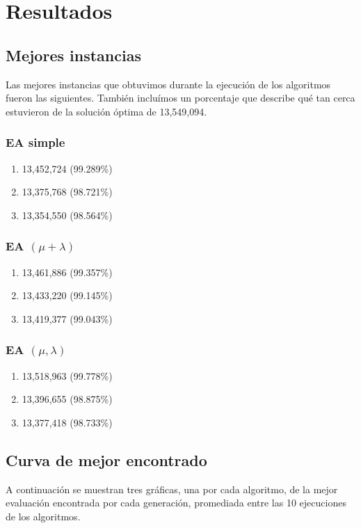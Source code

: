 \documentclass[sigconf,authorversion,nonacm]{acmart}
\begin{document}
\section{Resultados}
\subsection{Mejores instancias}
Las mejores instancias que obtuvimos durante la ejecución de los algoritmos fueron las siguientes. También incluímos un porcentaje que describe qué tan cerca estuvieron de la solución óptima de 13,549,094.

\subsubsection{EA simple}
\begin{enumerate}
  \item 13,452,724 (99.289\%)
  \item 13,375,768 (98.721\%)
  \item 13,354,550 (98.564\%)
\end{enumerate}

\subsubsection{EA $(\mu + \lambda)$}
\begin{enumerate}
  \item 13,461,886 (99.357\%)
  \item 13,433,220 (99.145\%)
  \item 13,419,377 (99.043\%)
\end{enumerate}

\subsubsection{EA $(\mu , \lambda)$}
\begin{enumerate}
  \item 13,518,963 (99.778\%)
  \item 13,396,655 (98.875\%)
  \item 13,377,418 (98.733\%)
\end{enumerate}

\subsection{Curva de mejor encontrado}
A continuación se muestran tres gráficas, una por cada algoritmo, de la mejor evaluación encontrada por cada generación, promediada entre las 10 ejecuciones de los algoritmos.
\end{document}
